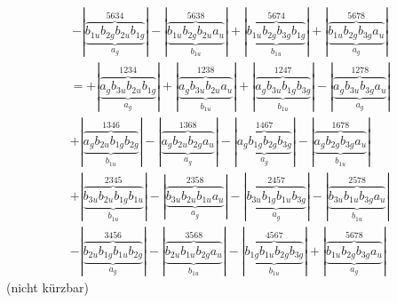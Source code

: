 \documentclass{article}
\begin{document}
\begin{multline*}
-\left|\underbrace{\overbrace{b_{1u} b_{2g} b_{2u} b_{1g}}^{5 6 3 4}}_{a_{g}}\right|-\left|\underbrace{\overbrace{b_{1u} b_{2g} b_{2u} a_{u}}^{5 6 3 8}}_{b_{1u}}\right|+\left|\underbrace{\overbrace{b_{1u} b_{2g} b_{3g} b_{1g}}^{5 6 7 4}}_{b_{1u}}\right|+\left|\underbrace{\overbrace{b_{1u} b_{2g} b_{3g} a_{u}}^{5 6 7 8}}_{a_{g}}\right|
\end{multline*}\begin{multline*}
=+\left|\underbrace{\overbrace{a_{g} b_{3u} b_{2u} b_{1g}}^{1 2 3 4}}_{a_{g}}\right|+\left|\underbrace{\overbrace{a_{g} b_{3u} b_{2u} a_{u}}^{1 2 3 8}}_{b_{1u}}\right|+\left|\underbrace{\overbrace{a_{g} b_{3u} b_{1g} b_{3g}}^{1 2 4 7}}_{b_{1u}}\right|-\left|\underbrace{\overbrace{a_{g} b_{3u} b_{3g} a_{u}}^{1 2 7 8}}_{a_{g}}\right|\\
+\left|\underbrace{\overbrace{a_{g} b_{2u} b_{1g} b_{2g}}^{1 3 4 6}}_{b_{1u}}\right|-\left|\underbrace{\overbrace{a_{g} b_{2u} b_{2g} a_{u}}^{1 3 6 8}}_{a_{g}}\right|-\left|\underbrace{\overbrace{a_{g} b_{1g} b_{2g} b_{3g}}^{1 4 6 7}}_{a_{g}}\right|-\left|\underbrace{\overbrace{a_{g} b_{2g} b_{3g} a_{u}}^{1 6 7 8}}_{b_{1u}}\right|\\
+\left|\underbrace{\overbrace{b_{3u} b_{2u} b_{1g} b_{1u}}^{2 3 4 5}}_{b_{1u}}\right|-\left|\underbrace{\overbrace{b_{3u} b_{2u} b_{1u} a_{u}}^{2 3 5 8}}_{a_{g}}\right|-\left|\underbrace{\overbrace{b_{3u} b_{1g} b_{1u} b_{3g}}^{2 4 5 7}}_{a_{g}}\right|-\left|\underbrace{\overbrace{b_{3u} b_{1u} b_{3g} a_{u}}^{2 5 7 8}}_{b_{1u}}\right|\\
-\left|\underbrace{\overbrace{b_{2u} b_{1g} b_{1u} b_{2g}}^{3 4 5 6}}_{a_{g}}\right|-\left|\underbrace{\overbrace{b_{2u} b_{1u} b_{2g} a_{u}}^{3 5 6 8}}_{b_{1u}}\right|-\left|\underbrace{\overbrace{b_{1g} b_{1u} b_{2g} b_{3g}}^{4 5 6 7}}_{b_{1u}}\right|+\left|\underbrace{\overbrace{b_{1u} b_{2g} b_{3g} a_{u}}^{5 6 7 8}}_{a_{g}}\right|
\end{multline*}(nicht kürzbar)\\ \\
\vspace{0.5cm}
\end{document}
